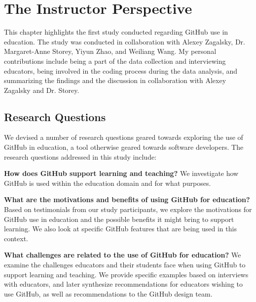\chapter{The Instructor Perspective}
This chapter highlights the first study conducted regarding GitHub use in education. The study was conducted in collaboration with Alexey Zagalsky, Dr. Margaret-Anne Storey, Yiyun Zhao, and Weiliang Wang. My personal contributions include being a part of the data collection and interviewing educators, being involved in the coding process during the data analysis, and summarizing the findings and the discussion in collaboration with Alexey Zagalsky and Dr. Storey.  %

\section{Research Questions}
We devised a number of research questions geared towards exploring the use of GitHub in education, a tool otherwise geared towards software developers. The research questions addressed in this study include:

\textbf{How does GitHub support learning and teaching?} We investigate how GitHub is used within the education domain and for what purposes. %

\textbf{What are the motivations and benefits of using GitHub for education?} Based on testimonials from our study participants, we explore the motivations for GitHub use in education and the possible benefits it might bring to support learning. We also look at specific GitHub features that are being used in this context.

\textbf{What challenges are related to the use of GitHub for education?} We examine the challenges educators and their students face when using GitHub to support learning and teaching. We provide specific examples based on interviews with educators, and later synthesize recommendations for educators wishing to use GitHub, as well as recommendations to the GitHub design team.

